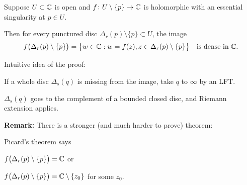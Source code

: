 \documentclass[10pt,aspectratio=169]{beamer}
\begin{document}
\begin{frame}
\begin{theorem}
Suppose $U \subset {\mathbb{C}}$ is open and $f \colon U \setminus \{ p \} \to {\mathbb{C}}$ is
holomorphic with
an essential singularity at $p \in U$.
\pause

Then for every punctured disc
$\Delta_r(p) \setminus \{ p \} \subset U$, the image
\begin{equation*}
f\bigl(\Delta_r(p) \setminus \{ p \} \bigr)
=
\bigl\{ w \in {\mathbb{C}} : w = f(z), z \in \Delta_r(p) \setminus \{ p \} \bigr\}
\quad \text{is dense in } {\mathbb{C}}.
\end{equation*}
\end{theorem}

\pause

Intuitive idea of the proof:

If a whole disc $\Delta_s(q)$ is missing from the image,
take $q$ to $\infty$ by an LFT.

\medskip
\pause

$\Delta_s(q)$ goes to the complement of a bounded closed disc,
and Riemann extension applies.

\pause
\medskip

\textbf{Remark:}
There is a stronger (and much harder to prove) theorem:

\pause
\medskip

Picard's theorem says

$f\bigl(\Delta_r(p) \setminus \{ p \} \bigr) = {\mathbb{C}}$ or 

$f\bigl(\Delta_r(p) \setminus \{ p \} \bigr) = {\mathbb{C}} \setminus \{ z_0 \}$ for
some $z_0$.

\end{frame}
\end{document}
